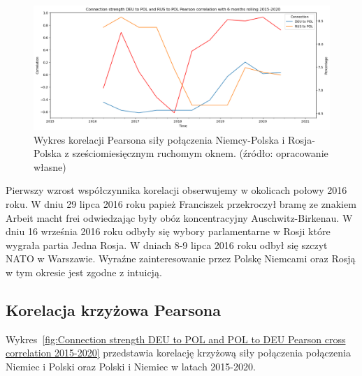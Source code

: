 \documentclass[11pt]{report}
\begin{document}
    \begin{figure}[!ht]
        \centering
        \includegraphics[width=\linewidth]{../spade_proto/figures/auto_seek/connection strength/pairwise_rolling_correlation/Connection strength DEU to POL and RUS to POL Pearson correlation with 6 months rolling 2015-2020.png}
        \caption{Wykres korelacji Pearsona siły połączenia Niemcy-Polska i Rosja-Polska z sześciomiesięcznym ruchomym oknem. (źródło: opracowanie własne)}
        \label{fig:Connection strength DEU to POL and RUS to POL Pearson correlation with 6 months rolling 2015-2020}
    \end{figure}

    Pierwszy wzrost współczynnika korelacji obserwujemy w okolicach połowy 2016 roku.
    W dniu 29 lipca 2016 roku papież Franciszek przekroczył bramę ze znakiem Arbeit macht frei odwiedzając
    były obóz koncentracyjny Auschwitz-Birkenau.
    W dniu 16 września 2016 roku odbyły się wybory parlamentarne w Rosji które wygrała partia Jedna Rosja.
    W dniach 8-9 lipca 2016 roku odbył się szczyt NATO w Warszawie.
    Wyraźne zainteresowanie przez Polskę Niemcami oraz Rosją w tym okresie jest zgodne z intuicją.

    \subsection{Korelacja krzyżowa Pearsona}
    Wykres~\ref{fig:Connection strength DEU to POL and POL to DEU Pearson cross correlation 2015-2020} przedstawia korelację krzyżową siły połączenia połączenia Niemiec i Polski oraz Polski i Niemiec w latach 2015-2020.
\end{document}
